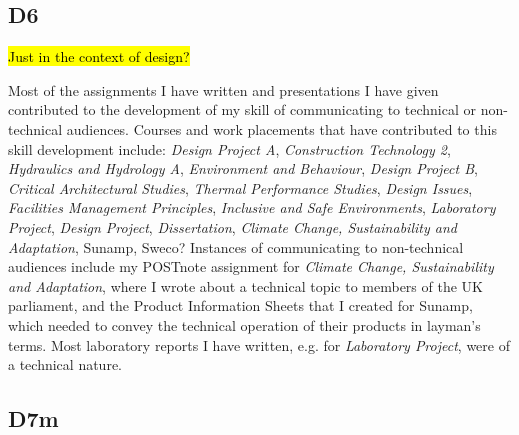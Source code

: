 \subsection*{D6}

\hl{Just in the context of design?}

Most of the assignments I have written and presentations I have given contributed to the development of my skill of communicating to technical or non-technical audiences.
Courses and work placements that have contributed to this skill development include:
\textit{Design Project A},
\textit{Construction Technology 2},
\textit{Hydraulics and Hydrology A},
\textit{Environment and Behaviour},
\textit{Design Project B},
\textit{Critical Architectural Studies},
\textit{Thermal Performance Studies},
\textit{Design Issues},
\textit{Facilities Management Principles},
\textit{Inclusive and Safe Environments},
\textit{Laboratory Project},
\textit{Design Project},
\textit{Dissertation},
\textit{Climate Change, Sustainability and Adaptation},
Sunamp,
Sweco?
Instances of communicating to non-technical audiences include my POSTnote assignment for \textit{Climate Change, Sustainability and Adaptation}, where I wrote about a technical topic to members of the UK parliament, and the Product Information Sheets that I created for Sunamp, which needed to convey the technical operation of their products in layman's terms.
Most laboratory reports I have written, e.g. for \textit{Laboratory Project}, were of a technical nature.


\subsection*{D7m}

